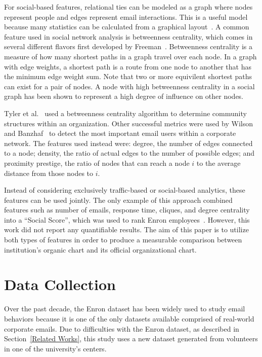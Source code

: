 \documentclass[10pt,twocolumn,conference]{IEEEtran}
\begin{document}
For social-based features, relational ties can be modeled as a graph where nodes represent people and edges represent email interactions.
This is a useful model because many statistics can be calculated from a graphical layout~\cite{wasserman1994social}.
A common feature used in social network analysis is betweenness centrality, which comes in several different flavors first developed by Freeman~\cite{freeman1977set}.
Betweenness centrality is a measure of how many shortest paths in a graph travel over each node.
In a graph with edge weights, a shortest path is a route from one node to another that has the minimum edge weight sum.
Note that two or more equivilent shortest paths can exist for a pair of nodes.
A node with high betweenness centrality in a social graph has been shown to represent a high degree of influence on other nodes.

Tyler et al.~\cite{tyler2005mail} used a betweenness centrality algorithm to determine community structures within an organization.
Other successful metrics were used by Wilson and Banzhaf~\cite{wilson2009discovery} to detect the most important email users within a corporate network.
The features used instead were: degree, the number of edges connected to a node; density, the ratio of actual edges to the number of possible edges; and proximity prestige, the ratio of nodes that can reach a node $i$ to the average distance from those nodes to $i$.

Instead of considering exclusively traffic-based or social-based analytics, these features can be used jointly.
The only example of this approach combined features such as number of emails, response time, cliques, and degree centrality into a ``Social Score'', which was used to rank Enron employees~\cite{rowe2007automated}.  
However, this work did not report any quantifiable results.
The aim of this paper is to utilize both types of features in order to produce a measurable comparison between institution's organic chart and its official organizational chart.

\section{Data Collection} \label{Data Collection}

Over the past decade, the Enron dataset has been widely used to study email behaviors because it is one of the only datasets available comprised of real-world corporate emails.
Due to difficulties with the Enron dataset, as described in Section~\ref{Related Works}, this study uses a new dataset generated from volunteers in one of the university's centers.
\end{document}
